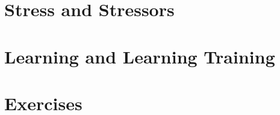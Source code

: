 \documentclass[makeidx]{book}
\begin{document}
\doparttoc
\frontmatter



%

\mainmatter
\part{Stress and Stressors}
\parttoc


\part{Learning and Learning Training}

\parttoc




% 

\part{Exercises}


{}

\backmatter
\printindexc
\end{document}
